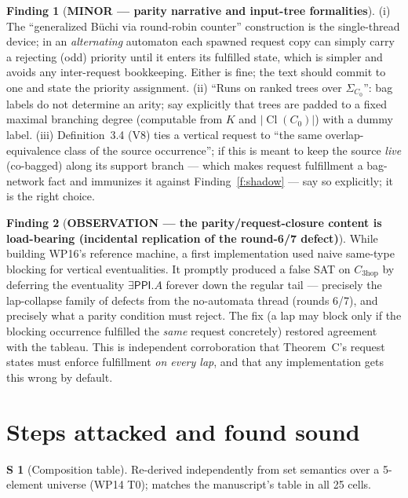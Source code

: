 \documentclass[11pt]{article}
\theoremstyle{definition}
\newtheorem{finding}{Finding}
\newtheorem{soundstep}{S}
\newcommand{\PPI}{\mathsf{PPI}}
\newcommand{\Cl}{\operatorname{Cl}}
\begin{document}
\begin{finding}[\textbf{MINOR --- parity narrative and input-tree
formalities}]\label{f:parity}
(i) The ``generalized B\"uchi via round-robin counter'' construction is the
single-thread device; in an \emph{alternating} automaton each spawned
request copy can simply carry a rejecting (odd) priority until it enters
its fulfilled state, which is simpler and avoids any inter-request
bookkeeping.  Either is fine; the text should commit to one and state the
priority assignment.  (ii) ``Runs on ranked trees over $\Sigma_{C_0}$'':
bag labels do not determine an arity; say explicitly that trees are padded
to a fixed maximal branching degree (computable from $K$ and $|\Cl(C_0)|$)
with a dummy label.  (iii) Definition~3.4 (V8) ties a vertical request to
``the same overlap-equivalence class of the source occurrence''; if this is
meant to keep the source \emph{live} (co-bagged) along its support branch
--- which makes request fulfillment a bag-network fact and immunizes it
against Finding~\ref{f:shadow} --- say so explicitly; it is the right
choice.
\end{finding}

\begin{finding}[\textbf{OBSERVATION --- the parity/request-closure content
is load-bearing (incidental replication of the round-6/7 defect)}]
\label{f:blocking}
While building WP16's reference machine, a first implementation used naive
same-type blocking for vertical eventualities.  It promptly produced a
false SAT on $C_{\mathrm{3hop}}$ by deferring the eventuality
$\exists\PPI.A$ forever down the regular tail --- precisely the lap-collapse
family of defects from the no-automata thread (rounds 6/7), and precisely
what a parity condition must reject.  The fix (a lap may block only if the
blocking occurrence fulfilled the \emph{same} request concretely) restored
agreement with the tableau.  This is independent corroboration that
Theorem~C's request states must enforce fulfillment \emph{on every lap},
and that any implementation gets this wrong by default.
\end{finding}

\section{Steps attacked and found sound}\label{sec:sound}

\begin{soundstep}[Composition table]
Re-derived independently from set semantics over a 5-element universe
(WP14 T0); matches the manuscript's table in all 25 cells.
\end{soundstep}
\end{document}
